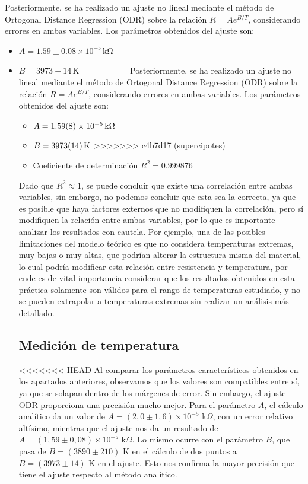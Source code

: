 \documentclass[11pt,a4paper]{article}
\begin{document}
Posteriormente, se ha realizado un ajuste no lineal mediante el método de Ortogonal Distance Regression (ODR) sobre la relación $R = A e^{B/T}$, considerando errores en ambas variables. Los parámetros obtenidos del ajuste son:
\begin{itemize}
    \item $A = 1.59 \pm 0.08\times 10^{-5}\,\mathrm{k\Omega}$
    \item $B = 3973 \pm 14\,\mathrm{K}$
=======
Posteriormente, se ha realizado un ajuste no lineal mediante el método de Ortogonal Distance Regression (ODR) sobre la relación $R = A e^{B/T}$, considerando errores en ambas variables. Los parámetros obtenidos del ajuste son:
\begin{itemize}
    \item $A = \qty{1.59 \pm 0.08e-5}{k\Omega}$
    \item $B = \qty{3973 \pm 14}{K}$
>>>>>>> c4b7d17 (supercipotes)
    \item Coeficiente de determinación $R^2 = 0.999876$
\end{itemize}


Dado que $R^2 \approx 1$, se puede concluir que existe una correlación entre ambas variables, sin embargo, no podemos concluir que esta sea la correcta,
ya que es posible que haya factores externos que no modifiquen la correlación, pero sí modifiquen la relación entre ambas variables, por lo que es importante analizar los resultados con cautela.
Por ejemplo, una de las posibles limitaciones del modelo teórico es que no considera temperaturas extremas, muy bajas o muy altas, que podrían alterar la estructura misma del material,
lo cual podría modificar esta relación entre resistencia y temperatura, por ende es de vital importancia considerar que los resultados obtenidos en esta práctica
solamente son válidos para el rango de temperaturas estudiado, y no se pueden extrapolar a temperaturas extremas sin realizar un análisis más detallado.
\subsection{Medición de temperatura}
<<<<<<< HEAD
Al comparar los parámetros característicos obtenidos en los apartados anteriores, observamos que los valores son compatibles entre sí, ya que se solapan dentro de los márgenes de error. Sin embargo, el ajuste ODR proporciona una precisión mucho mejor. Para el parámetro $A$, el cálculo analítico da un valor de $A = (2,0 \pm 1,6) \times 10^{-5} \text{ k}\Omega$, con un error relativo altísimo, mientras que el ajuste nos da un resultado de $A = (1,59 \pm 0,08) \times 10^{-5} \text{ k}\Omega$. Lo mismo ocurre con el parámetro $B$, que pasa de $B = (3890 \pm 210) \text{ K}$ en el cálculo de dos puntos a $B = (3973 \pm 14) \text{ K}$ en el ajuste. Esto nos confirma la mayor precisión que tiene el ajuste respecto al método analítico.


\end{itemize}
\end{document}
